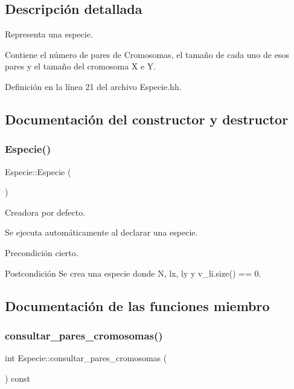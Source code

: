 \subsection{Descripción detallada}
Representa una especie. 

Contiene el número de pares de Cromosomas, el tamaño de cada uno de esos pares y el tamaño del cromosoma X e Y. 

Definición en la línea 21 del archivo Especie.\+hh.



\subsection{Documentación del constructor y destructor}
\mbox{\label{class_especie_a272c2488719cc9874b2f174906675b3d}} 
\subsubsection{\texorpdfstring{Especie()}{Especie()}}
{\footnotesize\ttfamily Especie\+::\+Especie (\begin{DoxyParamCaption}{ }\end{DoxyParamCaption})}



Creadora por defecto. 

Se ejecuta automáticamente al declarar una especie. \begin{DoxyPrecond}{Precondición}
cierto. 
\end{DoxyPrecond}
\begin{DoxyPostcond}{Postcondición}
Se crea una especie donde N, lx, ly y v\+\_\+li.\+size() == 0. 
\end{DoxyPostcond}


\subsection{Documentación de las funciones miembro}
\mbox{\label{class_especie_a163bb40ff71d1792c7dddb13e62261ef}} 
\subsubsection{\texorpdfstring{consultar\+\_\+pares\+\_\+cromosomas()}{consultar\_pares\_cromosomas()}}
{\footnotesize\ttfamily int Especie\+::consultar\+\_\+pares\+\_\+cromosomas (\begin{DoxyParamCaption}{ }\end{DoxyParamCaption}) const}



